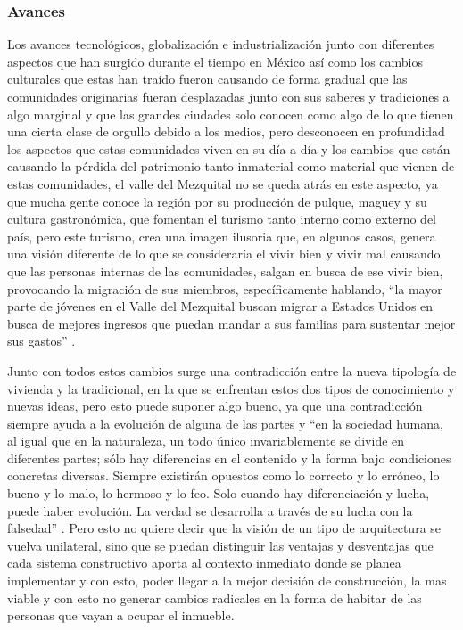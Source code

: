 \subsubsection{Avances}
Los avances tecnológicos, globalización e industrialización junto con diferentes aspectos que han surgido durante el tiempo en México así como los cambios culturales que estas han traído fueron causando de forma gradual que las comunidades originarias fueran desplazadas junto con sus saberes y tradiciones a algo marginal y que las grandes ciudades solo conocen como algo de lo que tienen una cierta clase de orgullo debido a los medios, pero desconocen en profundidad los aspectos que estas comunidades viven en su día a día y los cambios que están causando la pérdida del patrimonio tanto inmaterial como material que vienen de estas comunidades, el valle del Mezquital no se queda atrás en este aspecto, ya que mucha gente conoce la región por su producción de pulque, maguey y su cultura gastronómica, que fomentan el turismo tanto interno como externo del país, pero este turismo, crea una imagen ilusoria que, en algunos casos, genera una visión diferente de lo que se consideraría el vivir bien y vivir mal causando que las personas internas de las comunidades, salgan en busca de ese vivir bien, provocando la migración de sus miembros, específicamente hablando, ``la mayor parte de jóvenes en el Valle del Mezquital buscan migrar a Estados Unidos en busca de mejores ingresos que puedan mandar a sus familias para sustentar mejor sus gastos'' \citep{baez2012pueblos}.

Junto con todos estos cambios surge una contradicción entre la nueva tipología de vivienda y la tradicional, en la que se enfrentan estos dos tipos de conocimiento y nuevas ideas, pero esto puede suponer algo bueno, ya que una contradicción siempre ayuda a la evolución de alguna de las partes y ``en la sociedad humana, al igual que en la naturaleza, un todo único invariablemente se divide en diferentes partes; sólo hay diferencias en el contenido y la forma bajo condiciones concretas diversas. Siempre existirán opuestos como lo correcto y lo erróneo, lo bueno y lo malo, lo hermoso y lo feo. Solo cuando hay diferenciación y lucha, puede haber evolución. La verdad se desarrolla a través de su lucha con la falsedad'' \citep{mao1974cinco}. Pero esto no quiere decir que la visión de un tipo de arquitectura se vuelva unilateral, sino que se puedan distinguir las ventajas y desventajas que  cada sistema constructivo aporta al contexto inmediato donde se planea implementar y con esto, poder llegar a la mejor decisión de construcción, la mas viable y con esto no generar cambios radicales en la forma de habitar de las personas que vayan a ocupar el inmueble.

